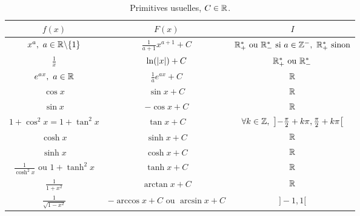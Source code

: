 \begin{table}[!ht]
    \centering
    \begin{tabular}{ccc}
         \toprule
         $f(x)$ & $F(x)$ & $I$ \\
         \midrule
         $x^a,\ a \in \mathbb{R} \backslash \{1\}$ & $\frac{1}{a + 1} x^{a+1} + C$ & $\mathbb{R}_+^* \text{ ou } \mathbb{R}_-^* \text{ si } a \in \mathbb{Z}^-,\ \mathbb{R}_+^* \text{ sinon}$ \\
         $\frac{1}{x}$ & $\ln(\abs{x}) + C$ & $\mathbb{R}_+^* \text{ ou } \mathbb{R}_-^*$ \\
         $e^{ax},\ a \in \mathbb{R}$ & $\frac{1}{a} e^{ax} + C$ & $\mathbb{R}$ \\
         $\cos{x}$ & $\sin{x} + C$ & $\mathbb{R}$ \\
         $\sin{x}$ & $-\cos{x} + C$ & $\mathbb{R}$ \\
         $1 + \cos^2{x} = 1 + \tan^2{x}$ & $\tan{x} + C$ & $\forall k \in \mathbb{Z},\ \left] -\frac{\pi}{2} + k \pi, \frac{\pi}{2} + k \pi \right[$ \\
         $\cosh{x}$ & $\sinh{x} + C$ & $\mathbb{R}$ \\
         $\sinh{x}$ & $\cosh{x} + C$ & $\mathbb{R}$ \\
         $\frac{1}{\cosh^2{x}} \text{ ou } 1 + \tanh^2{x}$ & $\tanh{x} + C$ & $\mathbb{R}$ \\
         $\frac{1}{1 + x^2}$ & $\arctan{x} + C$ & $\mathbb{R}$ \\
         $\frac{1}{\sqrt{1 - x^2}}$ & $-\arccos{x} + C \text{ ou } \arcsin{x} + C$ & $]-1, 1[$ \\
         \bottomrule
    \end{tabular}
    \caption{Primitives usuelles, $C \in \mathbb{R}$.}
    \label{tab:primitives_usuelles}
\end{table}

